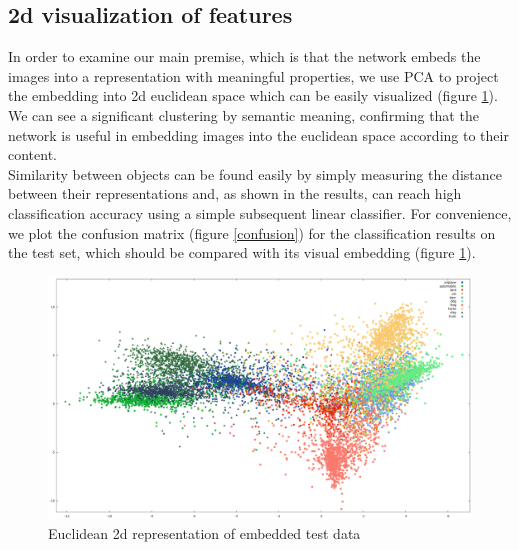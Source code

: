 \documentclass{article} %
\begin{document}
\subsection{2d visualization of features}
In order to examine our main premise, which is that the network embeds the images into a representation with meaningful properties, we
use PCA to project the embedding into 2d euclidean space which can be easily visualized (figure \ref{EuclideanRepresentation}).
We can see a significant clustering by semantic meaning, confirming that the network is useful in embedding
images into the euclidean space according to their content. \\ Similarity between objects can be found easily by simply measuring the distance between their representations and, as shown in the results, can reach high
classification accuracy using a simple subsequent linear classifier. For convenience, we plot the confusion matrix (figure \ref{confusion}) for the classification results on the test set, which should be compared with its visual embedding (figure \ref{EuclideanRepresentation}).

\begin{figure}[h]
\begin{center}
\includegraphics[width=1\linewidth]{EuclideanRepresentation.eps}
\end{center}
   \caption{Euclidean 2d representation of embedded test data}\label{EuclideanRepresentation}
\end{figure}
\end{document}
